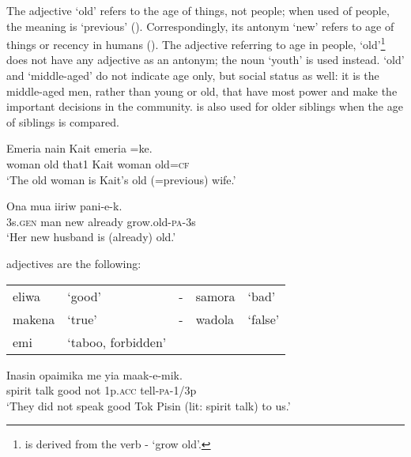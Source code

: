  The adjective  `old' refers to the age of things, not people; when used of people, the meaning is `previous' (). Correspondingly, its antonym  `new' refers to age of things or recency in humans (). The adjective referring to age in people,  `old'\footnote{ is derived from the verb - `grow old'.} does not have any adjective as an antonym; the noun  `youth' is used instead.  `old' and  `middle-aged' do not indicate age only, but social status as well: it is the middle-aged men, rather than young or old, that have most power and make the important decisions in the community.  is also used for older siblings when the age of siblings is compared.

\ea%
\label{ex:x74}
\gll Emeria  nain Kait emeria =ke. \\
woman old that1 Kait woman old=\textsc{cf}\\
\glt`The old woman is Kait's old (=previous) wife.'
\z

\ea%
\label{ex:x75}
\gll Ona mua  iiriw pani-e-k. \\
3s.\textsc{gen} man new already grow.old-\textsc{pa}-3s\\
\glt`Her new husband is (already) old.'
\z

 adjectives are the following: 

\begin{tabular}{llcll}
eliwa &`good' &- &samora &`bad'\\
makena &`true' &- &wadola &`false'\\
emi &`taboo, forbidden'&&&
\end{tabular}

\ea%
\label{ex:x1760}
\gll Inasin opaimika  me yia maak-e-mik. \\
spirit talk good not 1p.\textsc{acc} tell-\textsc{pa}-1/3p\\
\glt`They did not speak good Tok Pisin (lit: spirit talk) to us.'
\z

